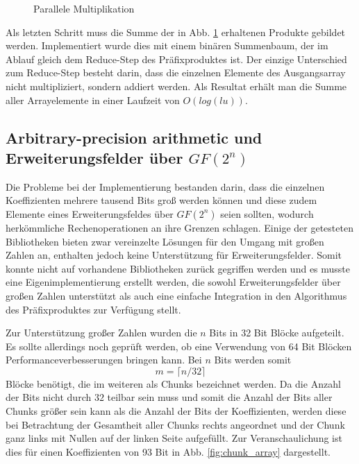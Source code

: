 {\begin{figure}
\centering

\caption{Parallele Multiplikation} \label{fig:parallel_multiplication}
\end{figure}

Als letzten Schritt muss die Summe der in Abb. \ref{fig:parallel_multiplication} erhaltenen Produkte gebildet werden. Implementiert wurde dies mit einem binären Summenbaum, der im Ablauf gleich dem Reduce-Step des Präfixproduktes ist. Der einzige Unterschied zum Reduce-Step besteht darin, dass die einzelnen Elemente des Ausgangsarray nicht multipliziert, sondern addiert werden. Als Resultat erhält man die Summe aller Arrayelemente in einer Laufzeit von $O(log(lu))$.

\subsection{Arbitrary-precision arithmetic und Erweiterungsfelder über $GF(2^n)$}
Die Probleme bei der Implementierung bestanden darin, dass die einzelnen Koeffizienten mehrere tausend Bits groß werden können und diese zudem Elemente eines Erweiterungsfeldes über $GF(2^n)$ seien sollten, wodurch herkömmliche Rechenoperationen an ihre Grenzen schlagen. Einige der getesteten Bibliotheken bieten zwar vereinzelte Lösungen für den Umgang mit großen Zahlen an, enthalten jedoch keine Unterstützung für Erweiterungsfelder. Somit konnte nicht auf vorhandene Bibliotheken zurück gegriffen werden und es musste eine Eigenimplementierung erstellt werden, die sowohl Erweiterungsfelder über großen Zahlen unterstützt als auch eine einfache Integration in den Algorithmus des Präfixproduktes zur Verfügung stellt.\newline

Zur Unterstützung großer Zahlen wurden die $n$ Bits in 32 Bit Blöcke aufgeteilt. Es sollte allerdings noch geprüft werden, ob eine Verwendung von 64 Bit Blöcken Performanceverbesserungen bringen kann. Bei $n$ Bits werden somit $$m = \lceil n/32 \rceil$$ Blöcke benötigt, die im weiteren als Chunks bezeichnet werden. Da die Anzahl der Bits nicht durch $32$ teilbar sein muss und somit die Anzahl der Bits aller Chunks größer sein kann als die Anzahl der Bits der Koeffizienten, werden diese bei Betrachtung der Gesamtheit aller Chunks rechts angeordnet und der Chunk ganz links mit Nullen auf der linken Seite aufgefüllt. Zur Veranschaulichung ist dies für einen Koeffizienten von 93 Bit in Abb. \ref{fig:chunk_array} dargestellt.\newline

}
